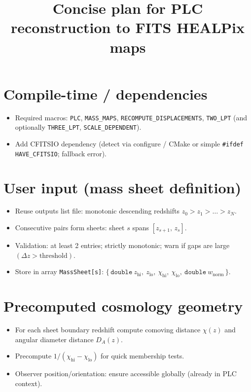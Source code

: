 \documentclass[11pt]{article}
\title{Concise plan for PLC reconstruction to FITS HEALPix maps}
\date{}
\begin{document}
\maketitle

\section{Compile-time / dependencies}
\begin{itemize}
  \item Required macros: \texttt{PLC}, \texttt{MASS\_MAPS}, \texttt{RECOMPUTE\_DISPLACEMENTS}, \texttt{TWO\_LPT} (and optionally \texttt{THREE\_LPT}, \texttt{SCALE\_DEPENDENT}).
  \item Add CFITSIO dependency (detect via configure / CMake or simple \verb|#ifdef HAVE_CFITSIO|; fallback error).
\end{itemize}

\section{User input (mass sheet definition)}
\begin{itemize}
  \item Reuse outputs list file: monotonic descending redshifts
  \(z_0 > z_1 > \dots > z_N\).
  \item Consecutive pairs form sheets: sheet \(s\) spans \([z_{s+1},\, z_s]\).
  \item Validation: at least 2 entries; strictly monotonic; warn if gaps are large \((\Delta z > \text{threshold})\).
  \item Store in array \verb|MassSheet[s]|: \(\{\,\texttt{double}\ z_{\mathrm{hi}},\ z_{\mathrm{lo}},\ \chi_{\mathrm{hi}},\ \chi_{\mathrm{lo}},\ \texttt{double}\ w_{\mathrm{norm}}\,\}\).
\end{itemize}

\section{Precomputed cosmology geometry}
\begin{itemize}
  \item For each sheet boundary redshift compute comoving distance \(\chi(z)\) and angular diameter distance \(D_A(z)\).
  \item Precompute \(1/(\chi_{\mathrm{hi}} - \chi_{\mathrm{lo}})\) for quick membership tests.
  \item Observer position/orientation: ensure accessible globally (already in PLC context).
\end{itemize}
\end{document}

